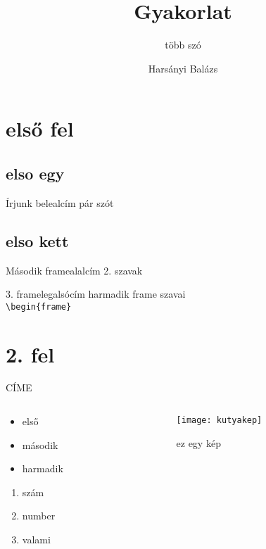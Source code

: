 \documentclass[aspectratio=169,bigger,xcolor={table}]{beamer}
\author{Harsányi Balázs}
\title{Gyakorlat}
\subtitle{több szó}
\begin{document}
\begin{frame}[plain]
\maketitle
\end{frame}

\section{első fel}

\subsection{elso egy}

\begin{frame}[allowframebreaks]{Írjunk bele}{alcím}
pár szót\\
\hulipsum[1-3]
\end{frame}

\subsection{elso kett}

\begin{frame}{Második frame}{alalcím}
2. szavak
\end{frame}

\begin{frame}[fragile]{3. frame}{legalsócím}
harmadik frame szavai \\
\verb|\begin{frame}|
\end{frame}

\section{2. fel}


\begin{frame}{CÍME}
\begin{columns}

\begin{column}{5cm}
\begin{itemize}
\item<3-> első 
\item<4> második
\item harmadik 
\end{itemize}
\begin{enumerate}
\item<1-2> szám
\item number
\item valami
\end{enumerate}
\end{column}

\begin{column}{5cm}
\begin{figure}
\caption{ez egy kép}
\texttt{[image: kutyakep]}
\end{figure}
\end{column}

\end{columns}
\end{frame}
\end{document}
